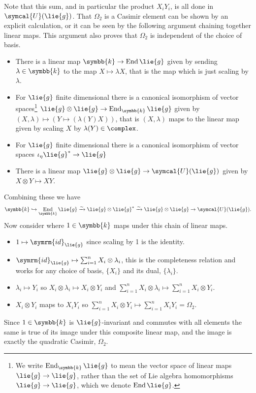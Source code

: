 \documentclass[fleqn]{NotesClass}
\renewcommand{\field}{\symbb{k}}
\newcommand{\id}{\symrm{id}}
\DeclareMathOperator{\End}{End}
\newcommand{\universalenveloping}{\symcal{U}}
\begin{document}
     Note that this sum, and in particular the product \(X_i Y_i\), is all done in \(\universalenveloping(\lie{g})\).
     That \(\Omega_2\) is a Casimir element can be shown by an explicit calculation, or it can be seen by the following argument chaining together linear maps.
     This argument also proves that \(\Omega_2\) is independent of the choice of basis.
     \begin{itemize}
         \item There is a linear map \(\field \to \End \lie{g}\) given by sending \(\lambda \in \field\) to the map \(X \mapsto \lambda X\), that is the map which is just scaling by \(\lambda\).
         \item For \(\lie{g}\) finite dimensional there is a canonical isomorphism of vector spaces\footnote{We write \(\End_{\field}\lie{g}\) to mean the vector space of linear maps \(\lie{g} \to \lie{g}\), rather than the set of Lie algebra homomorphisms \(\lie{g} \to \lie{g}\), which we denote \(\End\lie{g}\).} \(\lie{g} \otimes \lie{g} \to \End_{\field} \lie{g}\) given by \((X, \lambda) \mapsto (Y \mapsto (\lambda(Y)X))\), that is \((X, \lambda)\) maps to the linear map given by scaling \(X\) by \(\lambda(Y) \in \complex\).
         \item For \(\lie{g}\) finite dimensional there is a canonical isomorphism of vector spaces \(\iota_\eta\lie{g}^* \to \lie{g}\)
         \item There is a linear map \(\lie{g} \otimes \lie{g} \to \universalenveloping(\lie{g})\) given by \(X \otimes Y \mapsto XY\).
     \end{itemize}
     Combining these we have
     \begin{equation}
         \field \hookrightarrow \End_{\field} \lie{g} \xrightarrow{\sim} \lie{g} \otimes \lie{g}^* \xrightarrow{\sim} \lie{g} \otimes \lie{g} \to \universalenveloping(\lie{g}).
     \end{equation}
     Now consider where \(1 \in \field\) maps under this chain of linear maps.
     \begin{itemize}
         \item \(1 \mapsto \id_{\lie{g}}\) since scaling by 1 is the identity.
         \item \(\id_{\lie{g}} \mapsto \sum_{i=1}^n X_i \otimes \lambda_i\), this is the completeness relation and works for any choice of basis, \(\{X_i\}\) and its dual, \(\{\lambda_i\}\).
         \item \(\lambda_i \mapsto Y_i\) so \(X_i \otimes \lambda_i \mapsto X_i \otimes Y_i\) and \(\sum_{i=1}^n X_i \otimes \lambda_i \mapsto \sum_{i=1}^n X_i \otimes Y_i\).
         \item \(X_i \otimes Y_i\) maps to \(X_i Y_i\) so \(\sum_{i=1}^n X_i \otimes Y_i \mapsto \sum_{i=1}^n X_i Y_i = \Omega_2\).
     \end{itemize}
     Since \(1 \in \field\) is \(\lie{g}\)-invariant and commutes with all elements the same is true of its image under this composite linear map, and the image is exactly the quadratic Casimir, \(\Omega_2\).
     
\end{document}

